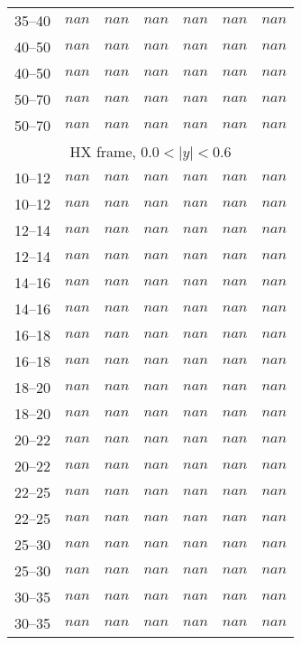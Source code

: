 \documentclass{article}
\begin{document}
\begin{table}[!h]
\begin{tabular}{|c|cccccc|}
35--40   &  $nan$  & $nan$  &  $nan$ &  $nan$  & $nan$  &  $nan$ \\
40--50   &  $nan$  & $nan$  &  $nan$ &  $nan$  & $nan$  &  $nan$ \\
40--50   &  $nan$  & $nan$  &  $nan$ &  $nan$  & $nan$  &  $nan$ \\
50--70   &  $nan$  & $nan$  &  $nan$ &  $nan$  & $nan$  &  $nan$ \\
50--70   &  $nan$  & $nan$  &  $nan$ &  $nan$  & $nan$  &  $nan$ \\
\hline \multicolumn{7}{|c|}{HX frame, $0.0 < |y| < 0.6$}\\ \hline \rule{0pt}{4mm}
10--12   &  $nan$  & $nan$  &  $nan$ &  $nan$  & $nan$  &  $nan$ \\
10--12   &  $nan$  & $nan$  &  $nan$ &  $nan$  & $nan$  &  $nan$ \\
12--14   &  $nan$  & $nan$  &  $nan$ &  $nan$  & $nan$  &  $nan$ \\
12--14   &  $nan$  & $nan$  &  $nan$ &  $nan$  & $nan$  &  $nan$ \\
14--16   &  $nan$  & $nan$  &  $nan$ &  $nan$  & $nan$  &  $nan$ \\
14--16   &  $nan$  & $nan$  &  $nan$ &  $nan$  & $nan$  &  $nan$ \\
16--18   &  $nan$  & $nan$  &  $nan$ &  $nan$  & $nan$  &  $nan$ \\
16--18   &  $nan$  & $nan$  &  $nan$ &  $nan$  & $nan$  &  $nan$ \\
18--20   &  $nan$  & $nan$  &  $nan$ &  $nan$  & $nan$  &  $nan$ \\
18--20   &  $nan$  & $nan$  &  $nan$ &  $nan$  & $nan$  &  $nan$ \\
20--22   &  $nan$  & $nan$  &  $nan$ &  $nan$  & $nan$  &  $nan$ \\
20--22   &  $nan$  & $nan$  &  $nan$ &  $nan$  & $nan$  &  $nan$ \\
22--25   &  $nan$  & $nan$  &  $nan$ &  $nan$  & $nan$  &  $nan$ \\
22--25   &  $nan$  & $nan$  &  $nan$ &  $nan$  & $nan$  &  $nan$ \\
25--30   &  $nan$  & $nan$  &  $nan$ &  $nan$  & $nan$  &  $nan$ \\
25--30   &  $nan$  & $nan$  &  $nan$ &  $nan$  & $nan$  &  $nan$ \\
30--35   &  $nan$  & $nan$  &  $nan$ &  $nan$  & $nan$  &  $nan$ \\
30--35   &  $nan$  & $nan$  &  $nan$ &  $nan$  & $nan$  &  $nan$ \\

\end{tabular}
\end{table}
\end{document}

